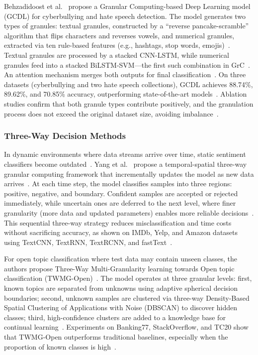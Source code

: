 \documentclass[a4paper,twoside,12pt]{book}
\begin{document}
Behzadidoost et al.~\cite{Behzadidoost2024GrC} propose a Granular Computing-based Deep Learning model (GCDL) for cyberbullying and hate speech detection. The model generates two types of granules: textual granules, constructed by a ``reverse pancake-scramble'' algorithm that flips characters and reverses vowels, and numerical granules, extracted via ten rule-based features (e.g., hashtags, stop words, emojis)~\cite{Behzadidoost2024GrC}. Textual granules are processed by a stacked CNN-LSTM, while numerical granules feed into a stacked BiLSTM-SVM---the first such combination in GrC~\cite{Behzadidoost2024GrC}. An attention mechanism merges both outputs for final classification~\cite{Behzadidoost2024GrC}. On three datasets (cyberbullying and two hate speech collections), GCDL achieves 88.74\%, 89.62\%, and 70.85\% accuracy, outperforming state-of-the-art models~\cite{Behzadidoost2024GrC}. Ablation studies confirm that both granule types contribute positively, and the granulation process does not exceed the original dataset size, avoiding imbalance~\cite{Behzadidoost2024GrC}.

\subsubsection{Three-Way Decision Methods}

In dynamic environments where data streams arrive over time, static sentiment classifiers become outdated~\cite{Yang2022temporal}. Yang et al.~\cite{Yang2022temporal} propose a temporal-spatial three-way granular computing framework that incrementally updates the model as new data arrives~\cite{Yang2022temporal}. At each time step, the model classifies samples into three regions: positive, negative, and boundary. Confident samples are accepted or rejected immediately, while uncertain ones are deferred to the next level, where finer granularity (more data and updated parameters) enables more reliable decisions~\cite{Yang2022temporal}. This sequential three-way strategy reduces misclassification and time costs without sacrificing accuracy, as shown on IMDb, Yelp, and Amazon datasets using TextCNN, TextRNN, TextRCNN, and fastText~\cite{Yang2022temporal}.

For open topic classification where test data may contain unseen classes, the authors propose Three-Way Multi-Granularity learning towards Open topic classification (TWMG-Open)~\cite{Yang2022threeway}. The model operates at three granular levels: first, known topics are separated from unknowns using adaptive spherical decision boundaries; second, unknown samples are clustered via three-way Density-Based Spatial Clustering of Applications with Noise (DBSCAN) to discover hidden classes; third, high-confidence clusters are added to a knowledge base for continual learning~\cite{Yang2022threeway}. Experiments on Banking77, StackOverflow, and TC20 show that TWMG-Open outperforms traditional baselines, especially when the proportion of known classes is high~\cite{Yang2022threeway}.
\end{document}
